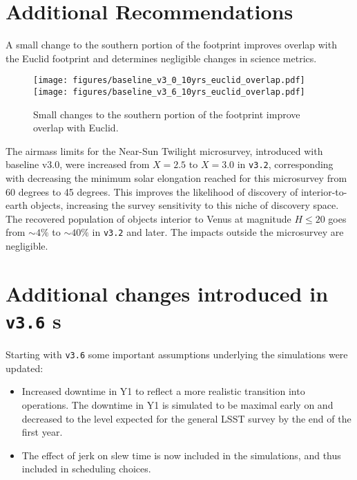 \section{Additional Recommendations}\label{sec:additional}

A small change to the southern portion of the footprint improves overlap with the Euclid footprint and determines negligible changes in science metrics. 
\begin{figure}
\centering
\texttt{[image: figures/baseline\_v3\_0\_10yrs\_euclid\_overlap.pdf]}
\texttt{[image: figures/baseline\_v3\_6\_10yrs\_euclid\_overlap.pdf]}

\caption{Small changes to the southern portion of the footprint improve overlap with Euclid.}
\end{figure}

The airmass limits for the Near-Sun Twilight microsurvey, introduced with baseline v3.0, were increased from $X=2.5$ to $X=3.0$ in \texttt{v3.2}, corresponding with decreasing the minimum solar elongation reached for this microsurvey from 60 degrees to 45 degrees. This improves the likelihood of discovery of interior-to-earth objects, increasing the survey sensitivity to this niche of discovery space. The recovered population of objects
interior to Venus at magnitude $H\leq20$ goes from $\sim4\%$ to $\sim40\%$ in \texttt{v3.2} and later. The impacts outside the microsurvey are negligible.

\section{Additional changes introduced in \texttt{v3.6} \opsim s }\label{sec:opsimchanges}
Starting with \texttt{v3.6} some important assumptions underlying the simulations were updated: 
\begin{itemize}
\item Increased downtime in Y1 to reflect a more realistic transition into operations. The downtime in Y1 is simulated to be maximal early on and decreased to the level expected for the general LSST survey by the end of the first year. 
\item The effect of jerk on slew time is now included in the simulations, and thus included in scheduling choices.
\end{itemize}

